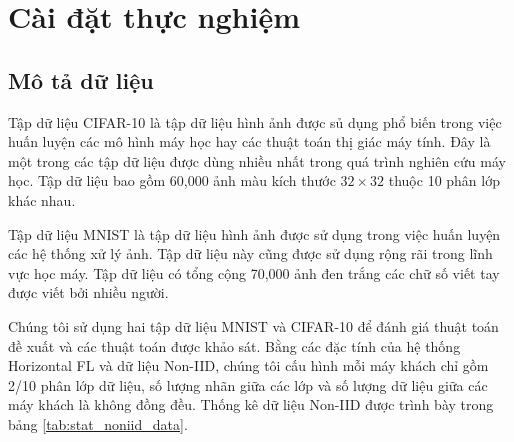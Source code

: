 \chapter{Cài đặt thực nghiệm}
\label{Chapter4}

\section{Mô tả dữ liệu}

Tập dữ liệu CIFAR-10 \cite{cifar-10} là tập dữ liệu hình ảnh được sủ dụng phổ biến trong việc huấn luyện các mô hình máy học hay các thuật toán thị giác máy tính. Đây là một trong các tập dữ liệu được dùng nhiều nhất trong quá trình nghiên cứu máy học. Tập dữ liệu bao gồm 60,000 ảnh màu kích thước $32\times 32$ thuộc 10 phân lớp khác nhau.

Tập dữ liệu MNIST \cite{mnist} là tập dữ liệu hình ảnh được sử dụng trong việc huấn luyện các hệ thống xử lý ảnh. Tập dữ liệu này cũng được sử dụng rộng rãi trong lĩnh vực học máy. Tập dữ liệu có tổng cộng 70,000 ảnh đen trắng các chữ số viết tay được viết bởi nhiều người.

Chúng tôi sử dụng hai tập dữ liệu MNIST và CIFAR-10 để đánh giá thuật toán đề xuất và các thuật toán được khảo sát. Bằng các đặc tính của hệ thống Horizontal FL và dữ liệu Non-IID, chúng tôi cấu hình mỗi máy khách chỉ gồm 2/10 phân lớp dữ liệu, số lượng nhãn giữa các lớp và số lượng dữ liệu giữa các máy khách là không đồng đều. Thống kê dữ liệu Non-IID được trình bày trong bảng \ref{tab:stat_noniid_data}.

\begin{table}[H]
    \caption{Thống kê trên hai tập dữ liệu MNIST và CIFAR-10 (dữ liệu Non-IID)}
    \label{tab:stat_noniid_data}
\end{table}


